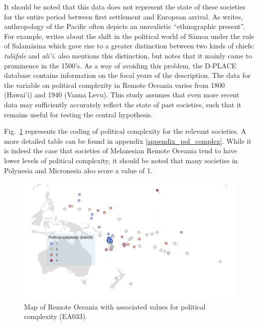 \documentclass[a4paper,10pt]{article} %
\begin{document}


It should be noted that this data does not represent the state of these societies for the entire period between first settlement and European arrival. As \citet{meleisea1995} writes, anthropology of the Pacific often depicts an unrealistic ``ethnographic present''. For example, \citet[185]{schoeffel87} writes about the shift in the political world of S\={a}moa under the rule of Salam\={a}sina which gave rise to a greater distinction between two kinds of chiefs: \emph{tul\={a}fale} and \emph{ali'i}. \citet[249]{kirch2017road} also mentions this distinction, but notes that it mainly came to prominence in the 1500's. As a way of avoiding this problem, the D-PLACE database \citep{d_place_all} contains information on the focal years of the description. The data for the variable on political complexity in Remote Oceania varies from 1800 (Hawai'i) and 1940 (Vanua Levu). This study assumes that even more recent data may sufficiently accurately reflect the state of past societies, such that it remains useful for testing the central hypothesis.

Fig.~\ref{pol_complex_map} represents the coding of political complexity for the relevant societies. A more detailed table can be found in appendix \ref{appendix_pol_complex}. While it is indeed the case that societies of Melanesian Remote Oceania tend to have lower levels of political complexity, it should be noted that many societies in Polynesia and Micronesia also score a value of 1.

\begin{figure}
\centering
\includegraphics[width=19cm]{map_pol_complex.png}
\caption[Map of Remote Oceania: Political complexity]{{Map of Remote Oceania with associated values for political complexity (EA033).}}
\label{pol_complex_map}
\end{figure}
\end{document}
